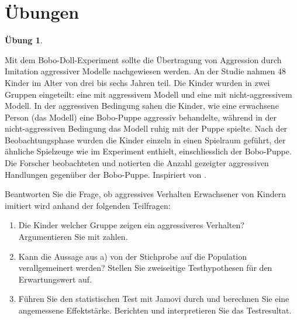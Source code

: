 \documentclass[
]{book}
\providecommand{\tightlist}{%
  \setlength{\itemsep}{0pt}\setlength{\parskip}{0pt}}
\theoremstyle{definition}
\theoremstyle{definition}
\theoremstyle{definition}
\newtheorem{exercise}{Übung}[chapter]
\theoremstyle{definition}
\theoremstyle{remark}
\begin{document}
\section{Übungen}\label{uxfcbungen-3}

\begin{exercise}
\protect\hypertarget{exr:bobo2groups}{}\label{exr:bobo2groups}\leavevmode

Mit dem Bobo-Doll-Experiment sollte die Übertragung von Aggression durch Imitation aggressiver Modelle nachgewiesen werden. An der Studie nahmen \(48\) Kinder im Alter von drei bis sechs Jahren teil. Die Kinder wurden in zwei Gruppen eingeteilt: eine mit aggressivem Modell und eine mit nicht-aggressivem Modell. In der aggressiven Bedingung sahen die Kinder, wie eine erwachsene Person (das Modell) eine Bobo-Puppe aggressiv behandelte, während in der nicht-aggressiven Bedingung das Modell ruhig mit der Puppe spielte. Nach der Beobachtungsphase wurden die Kinder einzeln in einen Spielraum geführt, der ähnliche Spielzeuge wie im Experiment enthielt, einschliesslich der Bobo-Puppe. Die Forscher beobachteten und notierten die Anzahl gezeigter aggressiven Handlungen gegenüber der Bobo-Puppe.
Inspiriert von \citet{bandura1961}.

Beantworten Sie die Frage, ob aggressives Verhalten Erwachsener von Kindern imitiert wird anhand der folgenden Teilfragen:

\begin{enumerate}
\def\labelenumi{\alph{enumi})}
\tightlist
\item
  Die Kinder welcher Gruppe zeigen ein aggressiveres Verhalten? Argumentieren Sie mit zahlen.
\item
  Kann die Aussage aus a) von der Stichprobe auf die Population verallgemeinert werden? Stellen Sie zweiseitige Testhypothesen für den Erwartungswert auf.
\item
  Führen Sie den statistischen Test mit Jamovi durch und berechnen Sie eine angemessene Effektstärke. Berichten und interpretieren Sie das Testresultat.
\end{enumerate}

\end{exercise}
\end{document}
